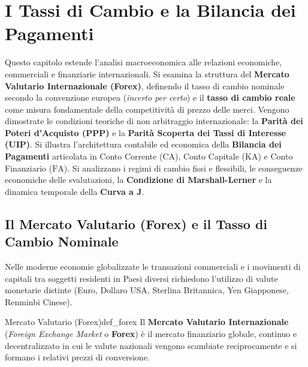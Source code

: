 \chapter{I Tassi di Cambio e la Bilancia dei Pagamenti}
\label{chap:tassi_cambio_bilancia_pagamenti}

\begin{tcolorbox}[colback=navyblue!5!white, colframe=navyblue, title=\textbf{Quadro Concettuale del Capitolo}]
Questo capitolo estende l'analisi macroeconomica alle relazioni economiche, commerciali e finanziarie internazionali. Si esamina la struttura del \textbf{Mercato Valutario Internazionale (Forex)}, definendo il tasso di cambio nominale secondo la convenzione europea (\textit{incerto per certo}) e il \textbf{tasso di cambio reale} come misura fondamentale della competitività di prezzo delle merci. Vengono dimostrate le condizioni teoriche di non arbitraggio internazionale: la \textbf{Parità dei Poteri d'Acquisto (PPP)} e la \textbf{Parità Scoperta dei Tassi di Interesse (UIP)}. Si illustra l'architettura contabile ed economica della \textbf{Bilancia dei Pagamenti} articolata in Conto Corrente ($\mathrm{CA}$), Conto Capitale ($\mathrm{KA}$) e Conto Finanziario ($\mathrm{FA}$). Si analizzano i regimi di cambio fissi e flessibili, le conseguenze economiche delle svalutazioni, la \textbf{Condizione di Marshall-Lerner} e la dinamica temporale della \textbf{Curva a J}.
\end{tcolorbox}

\section{Il Mercato Valutario (Forex) e il Tasso di Cambio Nominale}

Nelle moderne economie globalizzate le transazioni commerciali e i movimenti di capitali tra soggetti residenti in Paesi diversi richiedono l'utilizzo di valute monetarie distinte (Euro, Dollaro USA, Sterlina Britannica, Yen Giapponese, Renminbi Cinese).

\begin{definizione}{Mercato Valutario (Forex)}{def_forex}
Il \textbf{Mercato Valutario Internazionale} (\textit{Foreign Exchange Market} o \textbf{Forex}) è il mercato finanziario globale, continuo e decentralizzato in cui le valute nazionali vengono scambiate reciprocamente e si formano i relativi prezzi di conversione.
\end{definizione}

